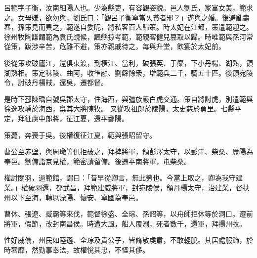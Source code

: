 \begin{pinyinscope}
 
 
 呂範字子衡，汝南細陽人也。少為縣吏，有容觀姿貌。邑人劉氏，家富女美，範求之。女母嫌，欲勿與，劉氏曰：「觀呂子衡寧當乆貧者邪？」遂與之婚。後避亂壽春，孫策見而異之，範遂自委昵，將私客百人歸策。時太妃在江都，策遣範迎之。徐州牧陶謙謂範為袁氏覘候，諷縣掠考範，範親客健兒篡取以歸。時唯範與孫河常從策，跋涉辛苦，危難不避，策亦親戚待之，每與升堂，飲宴於太妃前。
 
 
 
 
 後從策攻破廬江，還俱東渡，到橫江、當利，破張英、于麋，下小丹楊、湖熟，領湖熟相。策定秣陵、曲阿，收笮融、劉繇餘衆，增範兵二千，騎五十匹。後領宛陵令，討破丹楊賊，還吳，遷都督。
 
 
 
 
是時下邳陳瑀自號吳郡太守，住海西，與彊族嚴白虎交通。策自將討虎，別遣範與徐逸攻瑀於海西，梟其大將陳牧。
 又從攻祖郎於陵陽，太史慈於勇里。七縣平定，拜征虜中郎將，征江夏，還平鄱陽。
 
 
 
 
 策薨，奔喪于吳。後權復征江夏，範與張昭留守。
 
 
 
 
 曹公至赤壁，與周瑜等俱拒破之，拜裨將軍，領彭澤太守，以彭澤、柴桑、歷陽為奉邑。劉備詣京見權，範密請留備。後遷平南將軍，屯柴桑。
 
 
 
 
 權討關羽，過範館，謂曰：「昔早從卿言，無此勞也。今當上取之，卿為我守建業。」權破羽還，都武昌，拜範建威將軍，封宛陵侯，領丹楊太守，治建業，督扶州以下至海，轉以溧陽、懷安、寧國為奉邑。
 
 
 
 
 曹休、張遼、臧霸等來伐，範督徐盛、全琮、孫韶等，以舟師拒休等於洞口。遷前將軍，假節，改封南昌侯。時遭大風，船人覆溺，死者數千，還軍，拜揚州牧。
 
 
性好威儀，州民如陸遜、全琮及貴公子，皆脩敬虔肅，不敢輕脫。其居處服飾，於時奢靡，然勤事奉法，故權恱其忠，不怪其侈。
 

\end{pinyinscope}
